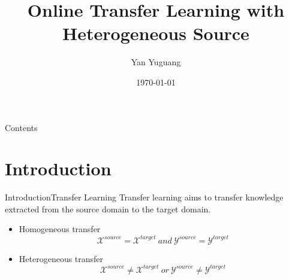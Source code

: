 \documentclass{beamer}
\begin{document}
\title[OHT]{Online Transfer Learning with Heterogeneous Source}
\author[yanyg]{Yan Yuguang}
\date{\today}
\subject{Online Heterogeneous Transfer}


\maketitle

\begin{frame}{Contents}
  \tableofcontents[hideallsubsections,sections={<1-7>}]
\end{frame}

\section{Introduction}
\begin{frame}{Introduction}{Transfer Learning}
Transfer learning aims to transfer knowledge extracted from the source domain to the target domain.
\begin{itemize}
\item
Homogeneous transfer
$$ \mathcal{X}^{source} = \mathcal{X}^{target} ~ and ~ \mathcal{Y}^{source} = \mathcal{Y}^{target} $$
\item
Heterogeneous transfer
$$ \mathcal{X}^{source} \neq \mathcal{X}^{target} ~ or ~ \mathcal{Y}^{source} \neq \mathcal{Y}^{target} $$
\end{itemize}
\end{frame}
\end{document}
